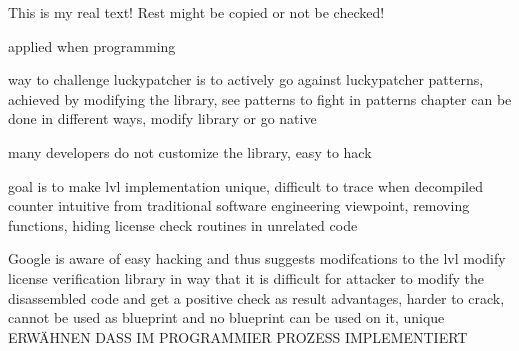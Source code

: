 This is my real text! Rest might be copied or not be checked!

applied when programming

%
way to challenge luckypatcher is to actively go against luckypatcher patterns, achieved by modifying the library, see patterns to fight in patterns chapter
can be done in different ways, modify library or go native

many developers do not customize the library, easy to hack
\cite{munteanLicense}
%

%
goal is to make lvl implementation unique, difficult to trace when decompiled
counter intuitive from traditional software engineering viewpoint, removing functions, hiding license check routines in unrelated code

Google is aware of easy hacking and thus suggests modifcations to the lvl
modify license verification library in way that it is difficult for attacker to modify the disassembled code and get a positive check as result
advantages, harder to crack, cannot be used as blueprint and no blueprint can be used on it, unique
\cite{developersSecuring}
%
ERWÄHNEN DASS IM PROGRAMMIER PROZESS  IMPLEMENTIERT\newline
